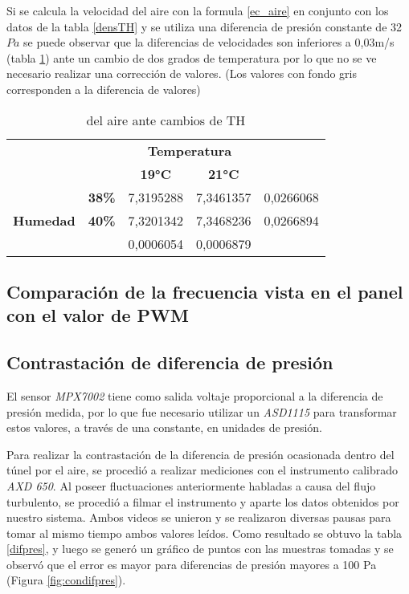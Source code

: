 Si se calcula la velocidad del aire con la formula \ref{ec_aire} en conjunto con los datos de la tabla \ref{densTH} y se utiliza una diferencia de presión constante de 32$Pa$ se puede observar que la diferencias de velocidades son inferiores a 0,03m/s (tabla \ref{velTH}) ante un cambio de dos grados de temperatura por lo que no se ve necesario realizar una corrección de valores.
(Los valores con fondo gris corresponden a la diferencia de valores)
\begin{table}[h!]
	\centering
	\begin{tabular}{lllll}
		&  & \multicolumn{2}{c}{\textbf{Temperatura}} &  \\
		&  & \multicolumn{1}{c}{\textbf{19°C}} & \multicolumn{1}{c}{\textbf{21°C}} & \multicolumn{1}{c}{\textbf{}} \\
		\multicolumn{1}{c}{} & \multicolumn{1}{r}{\textbf{38\%}} & 7,3195288 & 7,3461357 & \cellcolor[HTML]{F2F2F2}0,0266068 \\
		\multicolumn{1}{c}{\multirow{-2}{*}{\textbf{Humedad}}} & \multicolumn{1}{r}{\textbf{40\%}} & 7,3201342 & 7,3468236 & \cellcolor[HTML]{F2F2F2}0,0266894 \\
		& \multicolumn{1}{c}{\textbf{}} & \cellcolor[HTML]{F2F2F2}0,0006054 & \cellcolor[HTML]{F2F2F2}0,0006879 & 
	\end{tabular}
\caption{del aire ante cambios de TH}
\label{velTH}
\end{table}

\subsection{Comparación de la frecuencia vista en el panel con el valor de PWM}

\subsection{Contrastación de diferencia de presión}

El sensor \textit{MPX7002} tiene como salida voltaje proporcional a la diferencia de presión medida, por lo que fue necesario utilizar un \textit{ASD1115} para transformar estos valores, a través de una constante, en unidades de presión.

Para realizar la contrastación de la diferencia de presión ocasionada dentro del túnel por el aire, se procedió a realizar mediciones con el instrumento calibrado \textit{AXD 650}. Al poseer fluctuaciones anteriormente habladas a causa del flujo turbulento, se procedió a filmar el instrumento y aparte los datos obtenidos por nuestro sistema. Ambos videos se unieron y se realizaron diversas pausas para tomar al mismo tiempo ambos valores leídos. Como resultado se obtuvo la tabla \ref{difpres}, y luego se generó un gráfico de puntos con las muestras tomadas y se observó que el error es mayor para diferencias de presión mayores a 100 Pa (Figura \ref{fig:condifpres}).


